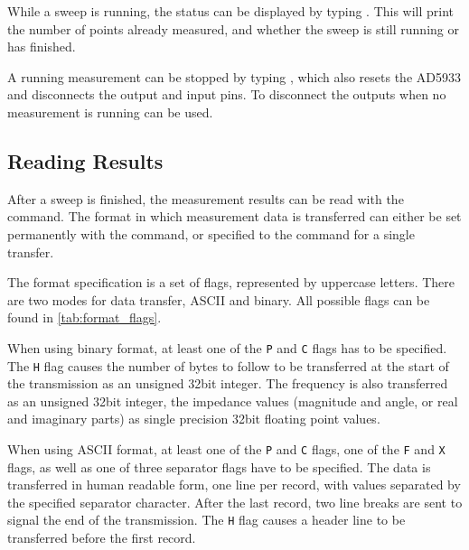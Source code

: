 While a sweep is running, the status can be displayed by typing . This will print the number of
points already measured, and whether the sweep is still running or has finished.

A running measurement can be stopped by typing , which also resets the AD5933 and disconnects the
output and input pins. To disconnect the outputs when no measurement is running  can be used.

\subsection{Reading Results}

After a sweep is finished, the measurement results can be read with the  command.
The format in which measurement data is transferred can either be set permanently with the
 command, or specified to the  command for a single transfer.

The format specification is a set of flags, represented by uppercase letters. There are two modes for data transfer,
ASCII and binary. All possible flags can be found in \autoref{tab:format_flags}.

When using binary format, at least one of the \texttt{P} and \texttt{C} flags has to be specified. The \texttt{H} flag
causes the number of bytes to follow to be transferred at the start of the transmission as an unsigned \unit{32}{bit}
integer. The frequency is also transferred as an unsigned \unit{32}{bit} integer, the impedance values (magnitude and
angle, or real and imaginary parts) as single precision \unit{32}{bit} floating point values.

When using ASCII format, at least one of the \texttt{P} and \texttt{C} flags, one of the \texttt{F} and \texttt{X}
flags, as well as one of three separator flags have to be specified. The data is transferred in human readable form,
one line per record, with values separated by the specified separator character. After the last record, two line breaks
are sent to signal the end of the transmission. The \texttt{H} flag causes a header line to be transferred before the
first record.

